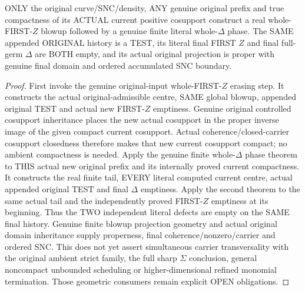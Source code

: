 \begin{theorem}
\label{hir:sharp-original-curve-two-actual-defect-erasure-phases}
\leanok
ONLY the original curve/SNC/density, ANY genuine original prefix and
true compactness of its ACTUAL current positive cosupport construct a
real whole-FIRST-$Z$ blowup followed by a genuine finite literal
whole-$\Delta$ phase. The SAME appended ORIGINAL history is a TEST,
its literal final FIRST $Z$ and final full-germ $\Delta$ are BOTH empty,
and its actual original projection is proper with genuine final domain
and ordered accumulated SNC boundary.
\end{theorem}
\begin{proof}
First invoke the genuine original-input whole-FIRST-$Z$ erasing step.
It constructs the actual original-admissible centre, SAME global blowup,
appended original TEST and actual new FIRST-$Z$ emptiness. Genuine
original controlled cosupport inheritance places the new actual
cosupport in the proper inverse image of the given compact current
cosupport. Actual coherence/closed-carrier cosupport closedness therefore
makes that new current cosupport compact; no ambient compactness is
needed.
Apply the genuine finite whole-$\Delta$ phase theorem to THIS actual
new original prefix and its internally proved current compactness.
It constructs the real finite tail, EVERY literal computed current
centre, actual appended original TEST and final $\Delta$ emptiness.
Apply the second theorem to the same actual tail and the independently
proved FIRST-$Z$ emptiness at its beginning. Thus the TWO independent
literal defects are empty on the SAME final history. Genuine finite
blowup projection geometry and actual original domain inheritance
supply properness, final coherence/nonzero/carrier and ordered SNC.
This does not yet assert simultaneous carrier transversality with the
original ambient strict family, the full sharp $\Sigma$ conclusion,
general noncompact unbounded scheduling or higher-dimensional refined
monomial termination. Those geometric consumers remain explicit OPEN
obligations.
\end{proof}
